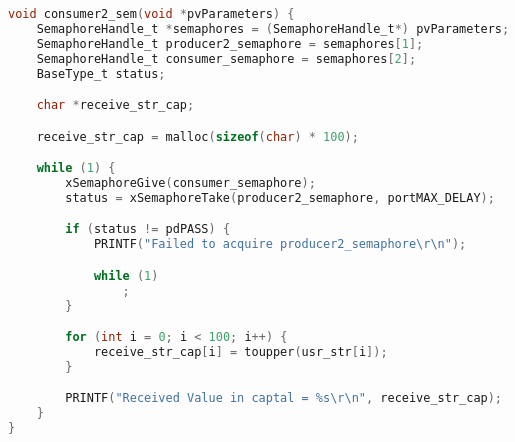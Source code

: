 \begin{lstlisting}[language=c,caption=Problem 3 Consumer 2 Task, label=list:p3_cons2]
void consumer2_sem(void *pvParameters) {
    SemaphoreHandle_t *semaphores = (SemaphoreHandle_t*) pvParameters;
    SemaphoreHandle_t producer2_semaphore = semaphores[1];
    SemaphoreHandle_t consumer_semaphore = semaphores[2];
    BaseType_t status;

    char *receive_str_cap;

    receive_str_cap = malloc(sizeof(char) * 100);

    while (1) {
        xSemaphoreGive(consumer_semaphore);
        status = xSemaphoreTake(producer2_semaphore, portMAX_DELAY);

        if (status != pdPASS) {
            PRINTF("Failed to acquire producer2_semaphore\r\n");

            while (1)
                ;
        }

        for (int i = 0; i < 100; i++) {
            receive_str_cap[i] = toupper(usr_str[i]);
        }

        PRINTF("Received Value in captal = %s\r\n", receive_str_cap);
    }
}
\end{lstlisting}
